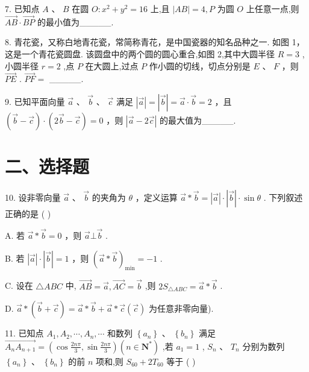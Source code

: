 7. 已知点 $A$ 、 $B$ 在圆 $O : {x}^{2} + {y}^{2} = {16}$ 上,且 $\left| {AB}\right|  = 4,P$ 为圆 $O$ 上任意一点,则 $\overrightarrow{AB} \cdot  \overrightarrow{BP}$ 的最小值为\_\_\_\_\_.

8. 青花瓷，又称白地青花瓷，常简称青花，是中国瓷器的知名品种之一. 如图 1，这是一个青花瓷圆盘. 该圆盘中的两个圆的圆心重合,如图 2,其中大圆半径 $R = 3$ ,小圆半径 $r = 2$ ,点 $P$ 在大圆上,过点 $P$ 作小圆的切线，切点分别是 $E$ 、 $F$ ，则 $\overrightarrow{PE}$ . $\overrightarrow{PF} =$ \_\_\_\_\_.

9. 已知平面向量 $\overrightarrow{a}$ 、 $\overrightarrow{b}$ 、 $\overrightarrow{c}$ 满足 $\left| \overrightarrow{a}\right|  = \left| \overrightarrow{b}\right|  = \overrightarrow{a} \cdot  \overrightarrow{b} = 2$ ，且 $\left( {\overrightarrow{b} - \overrightarrow{c}}\right)  \cdot  \left( {2\overrightarrow{b} - \overrightarrow{c}}\right)  = 0$ ，则 $\left| {\overrightarrow{a} - 2\overrightarrow{c}}\right|$ 的最大值为\_\_\_\_\_.

\section*{二、选择题}

10. 设非零向量 $\overrightarrow{a}$ 、 $\overrightarrow{b}$ 的夹角为 $\theta$ ，定义运算 $\overrightarrow{a} * \overrightarrow{b} = \left| \overrightarrow{a}\right|  \cdot  \left| \overrightarrow{b}\right|  \cdot  \sin \theta$ . 下列叙述正确的是 ( )

A. 若 $\overrightarrow{a} * \overrightarrow{b} = 0$ ，则 $\overrightarrow{a} \bot  \overrightarrow{b}$ .

B. 若 $\left| \overrightarrow{a}\right|  \cdot  \left| \overrightarrow{b}\right|  = 1$ ，则 ${\left( \overrightarrow{a} * \overrightarrow{b}\right) }_{\min } =  - 1$ .

C. 设在 $\bigtriangleup {ABC}$ 中, $\overrightarrow{AB} = \overrightarrow{a},\overrightarrow{AC} = \overrightarrow{b}$ ,则 $2{S}_{\bigtriangleup {ABC}} = \overrightarrow{a} * \overrightarrow{b}$ .

D. $\overrightarrow{a} * \left( {\overrightarrow{b} + \overrightarrow{c}}\right)  = \overrightarrow{a} * \overrightarrow{b} + \overrightarrow{a} * \overrightarrow{c}\left( \overrightarrow{c}\right)$ 为任意非零向量).

11. 已知点 ${A}_{1},{A}_{2},\cdots ,{A}_{n},\cdots$ 和数列 $\left\{  {a}_{n}\right\}$ 、 $\left\{  {b}_{n}\right\}$ 满足 $\overrightarrow{{A}_{n}{A}_{n + 1}} = \left( {\cos \frac{2n\pi }{3},\sin \frac{2n\pi }{3}}\right) \left( {n \in  {\mathbf{N}}^{ * }}\right)$ ,若 ${a}_{1} = 1$ , ${S}_{n}\text{ 、 }{T}_{n}$ 分别为数列 $\left\{  {a}_{n}\right\}  \text{ 、 }\left\{  {b}_{n}\right\}$ 的前 $n$ 项和,则 ${S}_{60} + 2{T}_{60}$ 等于 ( )

